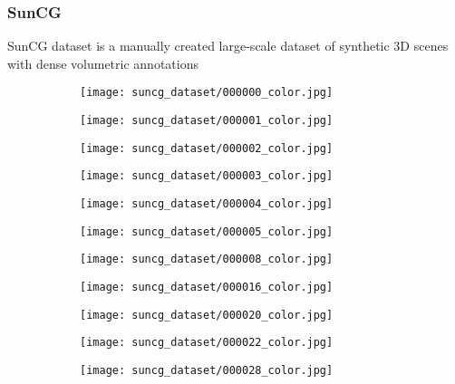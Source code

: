 \subsubsection{SunCG}
SunCG dataset is a manually created large-scale dataset of synthetic 3D scenes with dense volumetric annotations \cite{song2016ssc}
\begin{figure}[h!]
  \centering
  \begin{subfigure}[b]{0.32\linewidth}
    \texttt{[image: suncg\_dataset/000000\_color.jpg]}
  \end{subfigure}
  \begin{subfigure}[b]{0.32\linewidth}
    \texttt{[image: suncg\_dataset/000001\_color.jpg]}
  \end{subfigure}
  \begin{subfigure}[b]{0.32\linewidth}
    \texttt{[image: suncg\_dataset/000002\_color.jpg]}
  \end{subfigure}
  \begin{subfigure}[b]{0.32\linewidth}
    \texttt{[image: suncg\_dataset/000003\_color.jpg]}
  \end{subfigure}
  \begin{subfigure}[b]{0.32\linewidth}
    \texttt{[image: suncg\_dataset/000004\_color.jpg]}
  \end{subfigure}
  \begin{subfigure}[b]{0.32\linewidth}
    \texttt{[image: suncg\_dataset/000005\_color.jpg]}
  \end{subfigure}
  \begin{subfigure}[b]{0.32\linewidth}
    \texttt{[image: suncg\_dataset/000008\_color.jpg]}
  \end{subfigure}
  \begin{subfigure}[b]{0.32\linewidth}
    \texttt{[image: suncg\_dataset/000016\_color.jpg]}
  \end{subfigure}
  \begin{subfigure}[b]{0.32\linewidth}
    \texttt{[image: suncg\_dataset/000020\_color.jpg]}
  \end{subfigure}
  \begin{subfigure}[b]{0.32\linewidth}
    \texttt{[image: suncg\_dataset/000022\_color.jpg]}
  \end{subfigure}
  \begin{subfigure}[b]{0.32\linewidth}
    \texttt{[image: suncg\_dataset/000028\_color.jpg]}

\end{subfigure}
\end{figure}

